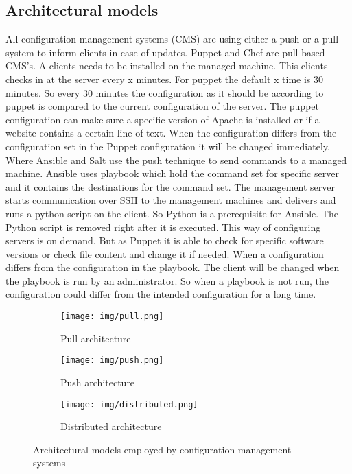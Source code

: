 \subsection{Architectural models}\label{subsec:archmod}
All configuration management systems (CMS) are using either a push or a pull system to inform clients in case of updates. \cite{papazoglou2003service} Puppet and Chef are pull based CMS's. A clients needs to be installed on the managed machine. This clients checks in at the server every x minutes. For puppet the default x time is 30 minutes. So every 30 minutes the configuration as it should be according to puppet is compared to the current configuration of the server. The puppet configuration can make sure a specific version of Apache is installed or if a website contains a certain line of text. When the configuration differs from the configuration set in the Puppet configuration it will be changed immediately. Where Ansible and Salt use the push technique to send commands to a managed machine. Ansible uses playbook which hold the command set for specific server and it contains the destinations for the command set. The management server starts communication over SSH to the management machines and delivers and runs a python script on the client. So Python is a prerequisite for Ansible. The Python script is removed right after it is executed. This way of configuring servers is on demand. But as Puppet it is able to check for specific software versions or check file content and change it if needed. When a configuration differs from the configuration in the playbook. The client will be changed when the playbook is run by an administrator. So when a playbook is not run, the configuration could differ from the intended configuration for a long time. 

\begin{figure}[H]
\centering
\begin{subfigure}{.33\textwidth}
  \centering
  \texttt{[image: img/pull.png]}
  \caption{Pull architecture}
  \label{fig:sub1}
\end{subfigure}%
\begin{subfigure}{.33\textwidth}
  \centering
  \texttt{[image: img/push.png]}
  \caption{Push architecture}
  \label{fig:sub2}
\end{subfigure}
\begin{subfigure}{.33\textwidth}
  \centering
  \texttt{[image: img/distributed.png]}
  \caption{Distributed architecture}
  \label{fig:sub3}
\end{subfigure}
\caption{Architectural models employed by configuration management systems}
\label{fig:archmodel}
\end{figure}

